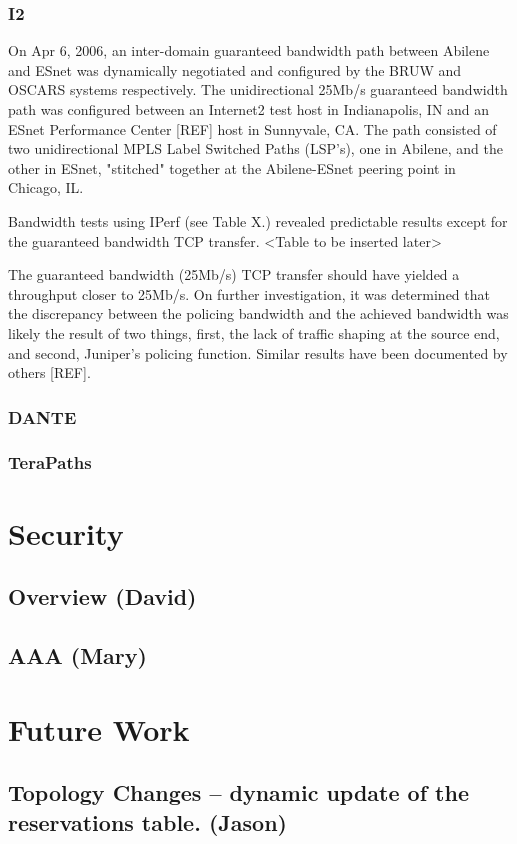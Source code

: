 \documentclass[conference]{IEEEtran}
\begin{document}
\subsubsection{I2}
On Apr 6, 2006, an inter-domain guaranteed bandwidth path between Abilene and 
ESnet was dynamically negotiated and configured by the BRUW and OSCARS systems 
respectively. The unidirectional 25Mb/s guaranteed bandwidth path was 
configured between an Internet2 test host in Indianapolis, IN and an ESnet 
Performance Center [REF] host in Sunnyvale, CA.  The path consisted of two 
unidirectional MPLS Label Switched Paths (LSP's), one in Abilene, and the 
other in ESnet, "stitched" together at the Abilene-ESnet peering point in 
Chicago, IL.

Bandwidth tests using IPerf (see Table X.) revealed predictable results except 
for the guaranteed bandwidth TCP transfer.
<Table to be inserted later>

The guaranteed bandwidth (25Mb/s) TCP transfer should have yielded a throughput 
closer to 25Mb/s.  On further investigation, it was determined that the 
discrepancy between the policing bandwidth and the achieved bandwidth was 
likely the result of two things, first, the lack of traffic shaping at the 
source end, and second, Juniper's policing function.  Similar results have been 
documented by others [REF].

\subsubsection{DANTE}
\subsubsection{TeraPaths}

\section{Security}
\subsection{Overview (David)}
\subsection{AAA (Mary)}

\section{Future Work}
\subsection{Topology Changes -- dynamic update of the reservations table. (Jason)}
\end{document}
